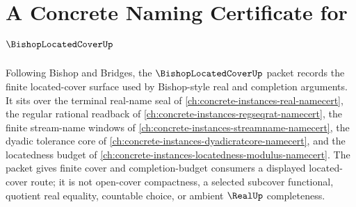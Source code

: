 \chapter{A Concrete Naming Certificate for $\BishopLocatedCoverUp$}
\label{ch:concrete-instances-bishop-located-cover-namecert}

Following Bishop and Bridges, the $\BishopLocatedCoverUp$ packet records the finite located-cover surface used by Bishop-style real and completion arguments. It sits over the terminal real-name seal of \autoref{ch:concrete-instances-real-namecert}, the regular rational readback of \autoref{ch:concrete-instances-regseqrat-namecert}, the finite stream-name windows of \autoref{ch:concrete-instances-streamname-namecert}, the dyadic tolerance core of \autoref{ch:concrete-instances-dyadicratcore-namecert}, and the locatedness budget of \autoref{ch:concrete-instances-locatedness-modulus-namecert}. The packet gives finite cover and completion-budget consumers a displayed located-cover route; it is not open-cover compactness, a selected subcover functional, quotient real equality, countable choice, or ambient $\RealUp$ completeness.

